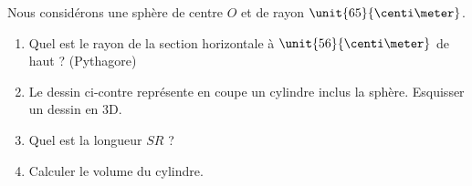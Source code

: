 
\begin{exercice}\label{exosmath-0094}

    \begin{minipage}{0.485\textwidth}

    Nous considérons une sphère de centre \( O\) et de rayon \( \unit{65}{\centi\meter}\).
        \begin{enumerate}
            \item
                Quel est le rayon de la section horizontale à \( \unit{56}{\centi\meter}\) de haut ? (Pythagore)
            \item
                Le dessin ci-contre représente en coupe un cylindre inclus la sphère. Esquisser un dessin en 3D.
            \item
                Quel est la longueur \( SR\) ?
            \item
                Calculer le volume du cylindre.
        \end{enumerate}
    \end{minipage}
    \hspace{1mm}
    \begin{minipage}{0.485\textwidth}
        \begin{center}

        \end{center}
    \end{minipage}

\end{exercice}
